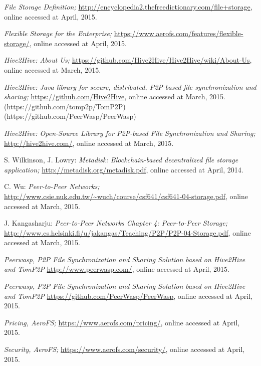 \begin{thebibliography}{99}
		\emph{File Storage Definition;}
		\url{http://encyclopedia2.thefreedictionary.com/file+storage},
		online accessed at April, 2015.

		\emph{Flexible Storage for the Enterprise;}
		\url{https://www.aerofs.com/features/flexible-storage/},
		online accessed at April, 2015.

		\emph{Hive2Hive: About Us;}
		\url{https://github.com/Hive2Hive/Hive2Hive/wiki/About-Us},
		online accessed at March, 2015.

		\emph{Hive2Hive: Java library for secure, distributed, P2P-based file synchronization and sharing;}
		\url{https://github.com/Hive2Hive},
		online accessed at March, 2015.
	(https://github.com/tomp2p/TomP2P) (https://github.com/PeerWasp/PeerWasp)

		\emph{Hive2Hive: Open-Source Library for P2P-based File Synchronization and Sharing;}
		\url{http://hive2hive.com/},
		online accessed at March, 2015.

		S. Wilkinson, J. Lowry:
		\emph{Metadisk: Blockchain-based decentralized file storage application;}
		\url{http://metadisk.org/metadisk.pdf},
		online accessed at April, 2014.
		
		C. Wu:
		\emph{Peer-to-Peer Networks;}
		\url{http://www.csie.nuk.edu.tw/~wuch/course/csf641/csf641-04-storage.pdf},
		online accessed at March, 2015.

		J. Kangasharju:
		\emph{Peer-to-Peer Networks Chapter 4: Peer-to-Peer Storage;}
		\url{http://www.cs.helsinki.fi/u/jakangas/Teaching/P2P/P2P-04-Storage.pdf},
		online accessed at March, 2015.

		\emph{Peerwasp, P2P File Synchronization and Sharing Solution based on Hive2Hive and TomP2P}
		\url{http://www.peerwasp.com/},
		online accessed at April, 2015.

		\emph{Peerwasp, P2P File Synchronization and Sharing Solution based on Hive2Hive and TomP2P}
		\url{https://github.com/PeerWasp/PeerWasp},
		online accessed at April, 2015.

		\emph{Pricing, AeroFS;}
		\url{https://www.aerofs.com/pricing/},
		online accessed at April, 2015.

		\emph{Security, AeroFS;}
		\url{https://www.aerofs.com/security/},
		online accessed at April, 2015.
		

\end{thebibliography}
